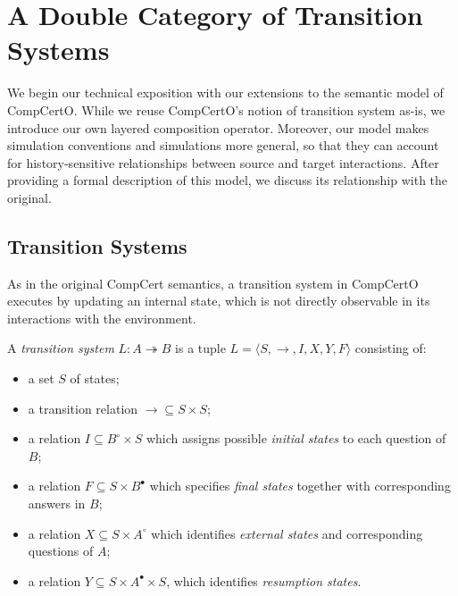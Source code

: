 \documentclass[acmsmall,screen,review,anonymous]{acmart}
\newcommand{\que}{\circ}
\newcommand{\ans}{\bullet}
\begin{document}



\section{A Double Category of Transition Systems} \label{sec:base} %


We begin our technical exposition with
our extensions to the semantic model of CompCertO.
While we reuse CompCertO's notion of transition system as-is,
we introduce our own layered composition operator.
Moreover,
our model makes simulation conventions and simulations
more general, so that they can account for
history-sensitive relationships
between source and target interactions.
After providing a formal description of this model,
we discuss its relationship with the original.


\subsection{Transition Systems} \label{sec:base:ts} %

As in the original CompCert semantics,
a transition system in CompCertO
executes by updating an internal state,
which is not directly observable
in its interactions with the environment.

\begin{definition} \label{def:lts} %
A \emph{transition system} $L : A \twoheadrightarrow B$
is a tuple $L = \langle S, {\rightarrow}, I, X, Y, F \rangle$
consisting of:
\begin{itemize}
  \item a set $S$ of states;
  \item a transition relation ${\rightarrow} \subseteq S \times S$;
  \item a relation $I \subseteq B^\que \times S$
    which assigns possible \emph{initial states}
    to each question of $B$;
  \item a relation $F \subseteq S \times B^\ans$
    which specifies \emph{final states} together with
    corresponding answers in $B$;
  \item a relation $X \subseteq S \times A^\que$
    which identifies \emph{external states} and
    corresponding questions of $A$;
  \item a relation $Y \subseteq S \times A^\ans \times S$,
    which identifies \emph{resumption states}.
\end{itemize}
\end{definition}
\end{document}
